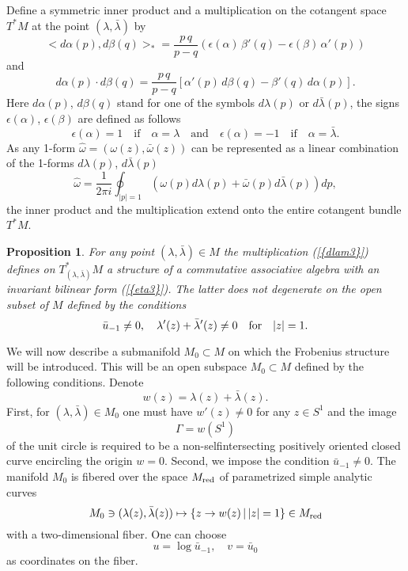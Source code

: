 \documentclass[numbook, envcountsame, envcountreset]{svjour3}
\newtheorem{prop}[theorem]{Proposition}
\begin{document}
Define a symmetric inner product and a multiplication on the cotangent space $T^*M$ at the point $(\lambda, \bar\lambda)$ by
\begin{equation}\label{eta3}
< d\alpha(p), d\beta(q)>_* =\frac{p\, q}{p-q} \left( \epsilon(\alpha)\, \beta'(q) -\epsilon(\beta)\, \alpha'(p)\right)
\end{equation}
and
\begin{equation}\label{dlam3}
d\alpha(p)\cdot d\beta(q) = \frac{p\, q}{p-q} \left[ \alpha'(p)\, d\beta(q) -\beta'(q)\, d\alpha(p)\right].
\end{equation}
Here $d\alpha(p)$, $d\beta(q)$ stand for one of the symbols $d\lambda(p)$ or $d\bar\lambda(p)$, the signs $\epsilon(\alpha)$, $\epsilon(\beta)$ are defined as follows
$$
\epsilon(\alpha)=1 \quad \mbox{if}\quad \alpha=\lambda\quad \mbox{and} \quad \epsilon(\alpha)=-1 \quad \mbox{if}\quad \alpha=\bar\lambda.
$$
As any 1-form $\hat\omega=(\omega(z), \bar\omega(z))$ can be represented as a linear combination of the 1-forms $d\lambda(p)$, $d\bar\lambda(p)$
$$
\hat\omega=\frac1{2\pi i} \oint_{|p|=1} \left(\omega(p) d\lambda(p)+  \bar\omega(p) d\bar\lambda(p)\right)dp,
$$
the inner product and the multiplication extend onto the entire cotangent bundle $T^*M$.

\begin{prop} \label{prop1} For any point $(\lambda,\bar\lambda)\in M$ the multiplication {(\ref{{dlam3}})} defines on $T^*_{(\lambda,\bar\lambda)}M$ a structure of a commutative associative algebra with an invariant bilinear form {(\ref{{eta3}})}. The latter does not degenerate on the open subset of $M$ defined by the conditions
\begin{equation}\label{pr1}
\bar u_{-1}\neq 0, \quad \lambda'(z) +\bar\lambda'(z) \neq 0 \quad {\rm for}\quad |z|=1.
\end{equation}
\end{prop}

We will now describe a submanifold $M_0\subset M$ on which the Frobenius structure will be introduced.
This will be an open subspace $M_0\subset M$ defined by the following conditions.
Denote
\begin{equation}\label{ww}
w(z) =\lambda(z) +\bar\lambda(z).
\end{equation}
First, for $(\lambda, \bar\lambda)\in M_0$ one must have $w'(z)\neq 0$ for any $z\in S^1$ and the image
$$
\Gamma=w(S^1)
$$
of the unit circle is required to be a non-selfintersecting positively oriented closed curve encircling the origin $w=0$. Second, we impose the condition $\bar u_{-1}\neq 0$. The manifold $M_0$ is fibered over the space $M_{\rm red}$ of parametrized simple analytic curves
\begin{equation}
M_0\ni (\lambda(z), \bar\lambda(z))  \mapsto \left\{ z\to w(z)\,|\, |z|=1\right\}\in M_{\rm red}
\end{equation}
with a two-dimensional fiber. One can choose 
\begin{equation}
u=\log \bar u_{-1}, \quad v=\bar u_0
\end{equation}
as coordinates on the fiber.
\end{document}
